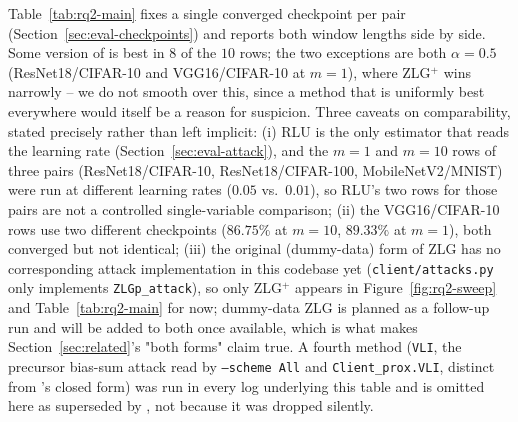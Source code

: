 Table~\ref{tab:rq2-main} fixes a single converged checkpoint per pair
(Section~\ref{sec:eval-checkpoints}) and reports both window lengths side
by side. Some version of \ourmethod{} is best in $8$ of the $10$ rows;
the two exceptions are both $\alpha=0.5$ (ResNet18/CIFAR-10 and
VGG16/CIFAR-10 at $m=1$), where ZLG$^+$ wins narrowly -- we do not smooth
over this, since a method that is uniformly best everywhere would itself
be a reason for suspicion. Three caveats on comparability, stated
precisely rather than left implicit: (i) RLU is the only estimator that
reads the learning rate (Section~\ref{sec:eval-attack}), and the $m=1$
and $m=10$ rows of three pairs (ResNet18/CIFAR-10, ResNet18/CIFAR-100,
MobileNetV2/MNIST) were run at different learning rates ($0.05$ vs.\
$0.01$), so RLU's two rows for those pairs are not a controlled
single-variable comparison; (ii) the VGG16/CIFAR-10 rows use two
different checkpoints ($86.75\%$ at $m=10$, $89.33\%$ at $m=1$), both
converged but not identical; (iii) the original (dummy-data) form of ZLG
has no corresponding attack implementation in this codebase yet
(\texttt{client/attacks.py} only implements \texttt{ZLGp\_attack}), so
only ZLG$^+$ appears in Figure~\ref{fig:rq2-sweep} and
Table~\ref{tab:rq2-main} for now; dummy-data ZLG is planned as a
follow-up run and will be added to both once available, which is what
makes Section~\ref{sec:related}'s "both forms" claim true. A fourth
method
(\texttt{VLI}, the precursor bias-sum attack read by \texttt{--scheme
All} and \texttt{Client\_prox.VLI}, distinct from \ourmethod{}'s closed
form) was run in every log underlying this table and is omitted here as
superseded by \ourmethod{}, not because it was dropped silently.

